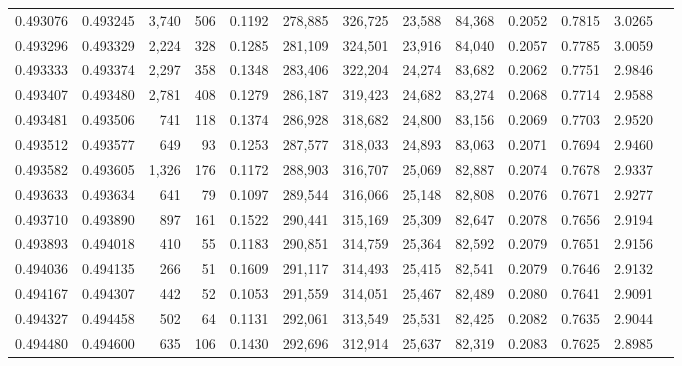 \begin{tabular}{rrrrrrrrrrrrr}
0.493076 & 0.493245 & 3,740 &   506 &                                     0.1192 & 278,885 & 326,725 &  23,588 &  84,368 & 0.2052 & 0.7815 & 3.0265 \\
0.493296 & 0.493329 & 2,224 &   328 &                                     0.1285 & 281,109 & 324,501 &  23,916 &  84,040 & 0.2057 & 0.7785 & 3.0059 \\
0.493333 & 0.493374 & 2,297 &   358 &                                     0.1348 & 283,406 & 322,204 &  24,274 &  83,682 & 0.2062 & 0.7751 & 2.9846 \\
0.493407 & 0.493480 & 2,781 &   408 &                                     0.1279 & 286,187 & 319,423 &  24,682 &  83,274 & 0.2068 & 0.7714 & 2.9588 \\
0.493481 & 0.493506 &   741 &   118 &                                     0.1374 & 286,928 & 318,682 &  24,800 &  83,156 & 0.2069 & 0.7703 & 2.9520 \\
0.493512 & 0.493577 &   649 &    93 &                                     0.1253 & 287,577 & 318,033 &  24,893 &  83,063 & 0.2071 & 0.7694 & 2.9460 \\
0.493582 & 0.493605 & 1,326 &   176 &                                     0.1172 & 288,903 & 316,707 &  25,069 &  82,887 & 0.2074 & 0.7678 & 2.9337 \\
0.493633 & 0.493634 &   641 &    79 &                                     0.1097 & 289,544 & 316,066 &  25,148 &  82,808 & 0.2076 & 0.7671 & 2.9277 \\
0.493710 & 0.493890 &   897 &   161 &                                     0.1522 & 290,441 & 315,169 &  25,309 &  82,647 & 0.2078 & 0.7656 & 2.9194 \\
0.493893 & 0.494018 &   410 &    55 &                                     0.1183 & 290,851 & 314,759 &  25,364 &  82,592 & 0.2079 & 0.7651 & 2.9156 \\
0.494036 & 0.494135 &   266 &    51 &                                     0.1609 & 291,117 & 314,493 &  25,415 &  82,541 & 0.2079 & 0.7646 & 2.9132 \\
0.494167 & 0.494307 &   442 &    52 &                                     0.1053 & 291,559 & 314,051 &  25,467 &  82,489 & 0.2080 & 0.7641 & 2.9091 \\
0.494327 & 0.494458 &   502 &    64 &                                     0.1131 & 292,061 & 313,549 &  25,531 &  82,425 & 0.2082 & 0.7635 & 2.9044 \\
0.494480 & 0.494600 &   635 &   106 &                                     0.1430 & 292,696 & 312,914 &  25,637 &  82,319 & 0.2083 & 0.7625 & 2.8985 \\

\end{tabular}
